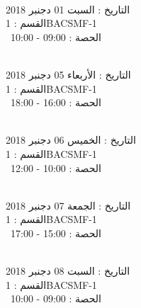\par
\noindent\makebox[\linewidth]{\rule{\paperwidth}{0.4pt}}
 \\
التاريخ : السبت 01 دجنبر 2018 \\
القسم : 1BACSMF-1 \\
 \  
الحصة : 09:00 - 10:00 \\
\par
\noindent\makebox[\linewidth]{\rule{\paperwidth}{0.4pt}}
 \\
التاريخ : الأربعاء 05 دجنبر 2018 \\
القسم : 1BACSMF-1 \\
 \  
الحصة : 16:00 - 18:00 \\
\par
\noindent\makebox[\linewidth]{\rule{\paperwidth}{0.4pt}}
 \\
التاريخ : الخميس 06 دجنبر 2018 \\
القسم : 1BACSMF-1 \\
 \  
الحصة : 10:00 - 12:00 \\
\par
\noindent\makebox[\linewidth]{\rule{\paperwidth}{0.4pt}}
 \\
التاريخ : الجمعة 07 دجنبر 2018 \\
القسم : 1BACSMF-1 \\
 \  
الحصة : 15:00 - 17:00 \\
\par
\noindent\makebox[\linewidth]{\rule{\paperwidth}{0.4pt}}
 \\
التاريخ : السبت 08 دجنبر 2018 \\
القسم : 1BACSMF-1 \\
 \  
الحصة : 09:00 - 10:00 \\
